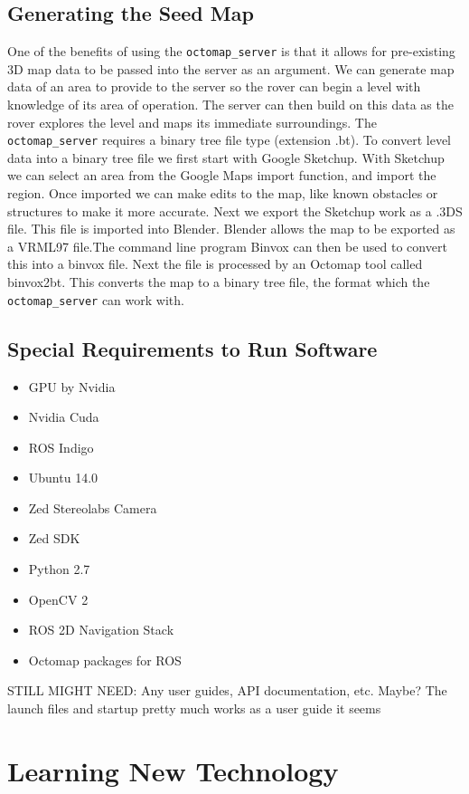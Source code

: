 \documentclass[10pt, oneside,onecolumn]{IEEEtran}
\begin{document}
\begin{titlepage}
\subsection{Generating the Seed Map}
One of the benefits of using the \texttt{octomap\_server} is that it allows for pre-existing 3D map data to be passed into the server as an argument. We can generate map data of an area to provide to the server so the rover can begin a level with knowledge of its area of operation. The server can then build on this data as the rover explores the level and maps its immediate surroundings. The \texttt{octomap\_server} requires a binary tree file type (extension .bt). To convert level data into a binary tree file we first start with Google Sketchup. With Sketchup we can select an area from the Google Maps import function, and import the region. Once imported we can make edits to the map, like known obstacles or structures to make it more accurate. Next we export the Sketchup work as a .3DS file. This file is imported into Blender. Blender allows the map to be exported as a VRML97 file.The command line program Binvox can then be used to convert this into a binvox file. Next the file is processed by an Octomap tool called binvox2bt. This converts the map to a binary tree file, the format which the \texttt{octomap\_server} can work with.


\subsection{Special Requirements to Run Software}
\begin{itemize}
\item GPU by Nvidia 
\item Nvidia Cuda 
\item ROS Indigo
\item Ubuntu 14.0
\item Zed Stereolabs Camera
\item Zed SDK
\item Python 2.7
\item OpenCV 2
\item ROS 2D Navigation Stack
\item Octomap packages for ROS
\end{itemize}

STILL MIGHT NEED: Any user guides, API documentation, etc. 
Maybe? The launch files and startup pretty much works as a user guide it seems

\section{Learning New Technology}

\end{titlepage}
\end{document}
